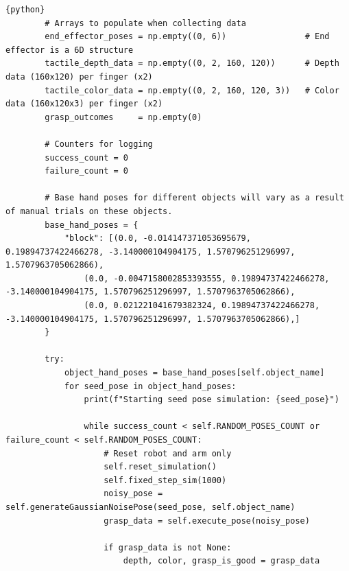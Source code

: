 \documentclass[11pt, a4paper]{report}
\begin{document}
\begin{lstlisting}{python}
        # Arrays to populate when collecting data
        end_effector_poses = np.empty((0, 6))                # End effector is a 6D structure
        tactile_depth_data = np.empty((0, 2, 160, 120))      # Depth data (160x120) per finger (x2)
        tactile_color_data = np.empty((0, 2, 160, 120, 3))   # Color data (160x120x3) per finger (x2)
        grasp_outcomes     = np.empty(0)

        # Counters for logging
        success_count = 0
        failure_count = 0

        # Base hand poses for different objects will vary as a result of manual trials on these objects.
        base_hand_poses = {
            "block": [(0.0, -0.014147371053695679, 0.19894737422466278, -3.140000104904175, 1.570796251296997, 1.5707963705062866),
                (0.0, -0.0047158002853393555, 0.19894737422466278, -3.140000104904175, 1.570796251296997, 1.5707963705062866),
                (0.0, 0.021221041679382324, 0.19894737422466278, -3.140000104904175, 1.570796251296997, 1.5707963705062866),]
        }

        try:
            object_hand_poses = base_hand_poses[self.object_name]
            for seed_pose in object_hand_poses:
                print(f"Starting seed pose simulation: {seed_pose}")

                while success_count < self.RANDOM_POSES_COUNT or failure_count < self.RANDOM_POSES_COUNT:
                    # Reset robot and arm only
                    self.reset_simulation()
                    self.fixed_step_sim(1000)
                    noisy_pose = self.generateGaussianNoisePose(seed_pose, self.object_name)
                    grasp_data = self.execute_pose(noisy_pose)

                    if grasp_data is not None:
                        depth, color, grasp_is_good = grasp_data


\end{lstlisting}
\end{document}
